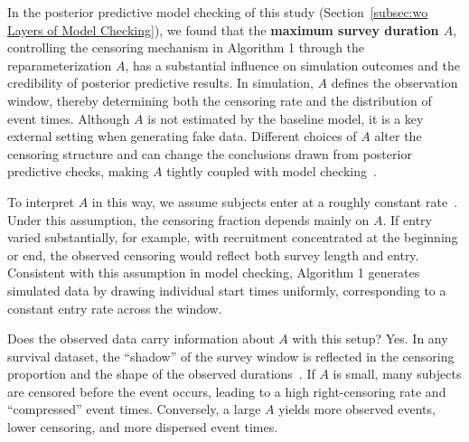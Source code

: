 In the posterior predictive model checking of this study (Section~\ref{subsec:wo Layers of Model Checking}), we found that the \textbf{maximum survey duration $A$}, controlling the censoring mechanism in Algorithm 1 through the reparameterization $A$, has a substantial influence on simulation outcomes and the credibility of posterior predictive results. In simulation, $A$ defines the observation window, thereby determining both the censoring rate and the distribution of event times.  Although $A$ is not estimated by the baseline model, it is a key external setting when generating fake data. Different choices of $A$ alter the censoring structure and can change the conclusions drawn from posterior predictive checks, making $A$ tightly coupled with model checking~\cite{https://doi.org/10.1002/sim.4385, stats5010006}.

To interpret $A$ in this way, we assume subjects enter at a roughly constant rate~\cite{doi:10.1177/0049124103257303}. Under this assumption, the censoring fraction depends mainly on $A$. If entry varied substantially, for example, with recruitment concentrated at the beginning or end, the observed censoring would reflect both survey length and entry. Consistent with this assumption in model checking, Algorithm 1 generates simulated data by drawing individual start times uniformly, corresponding to a constant entry rate across the window.

Does the observed data carry information about $A$ with this setup? Yes. In any survival dataset, the “shadow” of the survey window is reflected in the censoring proportion and the shape of the observed durations~\cite{barrajón2020effectrightcensoringbias, stats5010006, bartovs2022informed}. If $A$ is small, many subjects are censored before the event occurs, leading to a high right-censoring rate and “compressed” event times. Conversely, a large $A$ yields more observed events, lower censoring, and more dispersed event times.

